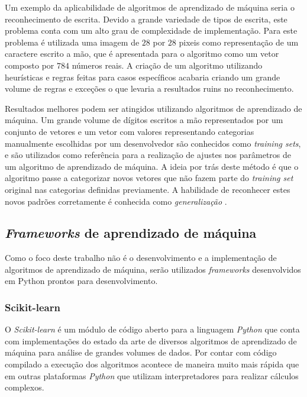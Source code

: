 Um exemplo da aplicabilidade de algoritmos de aprendizado de máquina seria o reconhecimento de escrita. Devido a grande variedade de tipos de escrita, este problema conta com um alto grau de complexidade de implementação. Para este problema é utilizada uma imagem de $28$ por $28$ pixeis como representação de um caractere escrito a mão, que é apresentada para o algoritmo como um vetor composto por $784$ números reais. A criação de um algoritmo utilizando heurísticas e regras feitas para casos específicos acabaria criando um grande volume de regras e exceções o que levaria a resultados ruins no reconhecimento. \cite{bishop:2006}

Resultados melhores podem ser atingidos utilizando algoritmos de aprendizado de máquina. Um grande volume de dígitos escritos a mão representados por um conjunto de vetores e um vetor com valores representando categorias manualmente escolhidas por um desenvolvedor são conhecidos como \textit{training sets}, e são utilizados como referência para a realização de ajustes nos parâmetros de um algoritmo de aprendizado de máquina. A ideia por trás deste método é que o algoritmo passe a categorizar novos vetores que não fazem parte do \textit{training set} original nas categorias definidas previamente. A habilidade de reconhecer estes novos padrões corretamente é conhecida como \textit{generalização} \cite{bishop:2006}.

\subsection{\textit{Frameworks} de aprendizado de máquina}

Como o foco deste trabalho não é o desenvolvimento e a implementação de algoritmos de aprendizado de máquina, serão utilizados \textit{frameworks} desenvolvidos em Python prontos para desenvolvimento. 

\subsubsection{Scikit-learn}

O \textit{Scikit-learn} é um módulo de código aberto para a linguagem \textit{Python} que conta com implementações do estado da arte de diversos algoritmos de aprendizado de máquina para análise de grandes volumes de dados. Por contar com código compilado a execução dos algoritmos acontece de maneira muito mais rápida que em outras plataformas \textit{Python} que utilizam interpretadores para realizar cálculos complexos. \cite{scikit-learn} 

